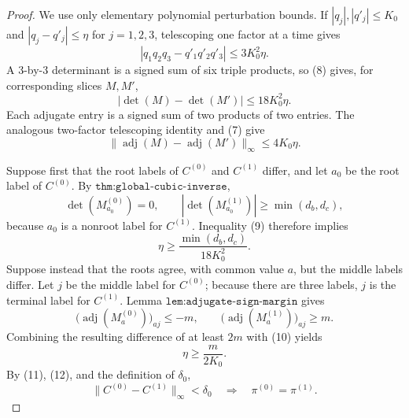 \documentclass{article}
\begin{document}
\begin{proof}
We use only elementary polynomial perturbation bounds.  If \(|q_j|,|q'_j|\leq K_0\) and \(|q_j-q'_j|\leq\eta\) for \(j=1,2,3\), telescoping one factor at a time gives
\[
 |q_1q_2q_3-q'_1q'_2q'_3|
 \leq3K_0^2\eta.                                                  \tag{8}
\]
A \(3\)-by-\(3\) determinant is a signed sum of six triple products, so (8) gives, for corresponding slices \(M,M'\),
\[
 |\det(M)-\det(M')|\leq18K_0^2\eta.                              \tag{9}
\]
Each adjugate entry is a signed sum of two products of two entries.  The analogous two-factor telescoping identity and (7) give
\[
 \|\operatorname{adj}(M)-\operatorname{adj}(M')\|_\infty
 \leq4K_0\eta.                                                    \tag{10}
\]

Suppose first that the root labels of \(C^{(0)}\) and \(C^{(1)}\) differ, and let \(a_0\) be the root label of \(C^{(0)}\).  By \(\texttt{thm:global-cubic-inverse}\),
\[
 \det(M_{a_0}^{(0)})=0,
 \qquad
 |\det(M_{a_0}^{(1)})|\geq\min(d_b,d_c),
\]
because \(a_0\) is a nonroot label for \(C^{(1)}\).  Inequality (9) therefore implies
\[
 \eta\geq\frac{\min(d_b,d_c)}{18K_0^2}.                           \tag{11}
\]
Suppose instead that the roots agree, with common value \(a\), but the middle labels differ.  Let \(j\) be the middle label for \(C^{(0)}\); because there are three labels, \(j\) is the terminal label for \(C^{(1)}\).  Lemma \(\texttt{lem:adjugate-sign-margin}\) gives
\[
 \bigl(\operatorname{adj}(M_a^{(0)})\bigr)_{aj}\leq-m,
 \qquad
 \bigl(\operatorname{adj}(M_a^{(1)})\bigr)_{aj}\geq m.
\]
Combining the resulting difference of at least \(2m\) with (10) yields
\[
 \eta\geq\frac{m}{2K_0}.                                         \tag{12}
\]
By (11), (12), and the definition of \(\delta_0\),
\[
 \|C^{(0)}-C^{(1)}\|_\infty<\delta_0
 \quad\Longrightarrow\quad
 \pi^{(0)}=\pi^{(1)}.                                             \tag{13}
\]


\end{proof}
\end{document}
